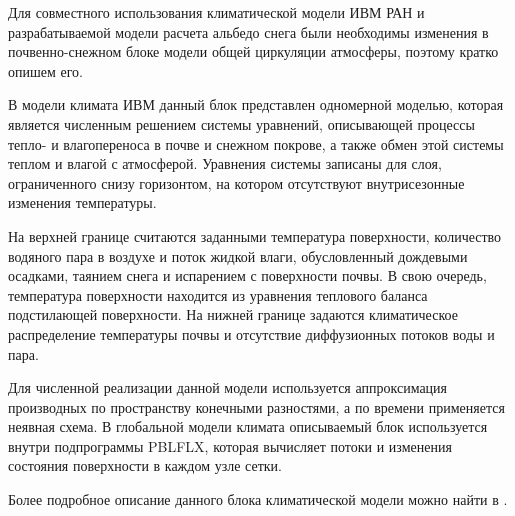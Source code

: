 \documentclass[a4paper, fontsize=14pt]{scrartcl}
\begin{document}
Для совместного использования климатической модели ИВМ РАН и разрабатываемой модели расчета альбедо снега были необходимы изменения в почвенно-снежном блоке модели общей циркуляции атмосферы, поэтому кратко опишем его.

В модели климата ИВМ данный блок представлен одномерной моделью, которая является численным решением системы уравнений, описывающей процессы тепло- и влагопереноса в почве и снежном покрове, а также обмен этой системы теплом и влагой с атмосферой. Уравнения системы записаны для слоя, ограниченного снизу горизонтом, на котором отсутствуют внутрисезонные изменения температуры.

На верхней границе считаются заданными температура поверхности, количество водяного пара в воздухе и поток жидкой влаги, обусловленный дождевыми осадками, таянием снега и испарением с поверхности почвы. В свою очередь, температура поверхности находится из уравнения теплового баланса подстилающей поверхности. На нижней границе задаются климатическое распределение температуры почвы и отсутствие диффузионных потоков воды и пара.

Для численной реализации данной модели используется аппроксимация производных по пространству конечными разностями, а по времени применяется неявная схема. В глобальной модели климата описываемый блок используется внутри подпрограммы PBLFLX, которая вычисляет потоки и изменения состояния поверхности в каждом узле сетки.

Более подробное описание данного блока климатической модели можно найти в \cite{Volodin1998, Volodina2000, Machulskaya_diss}. 

\end{document}
